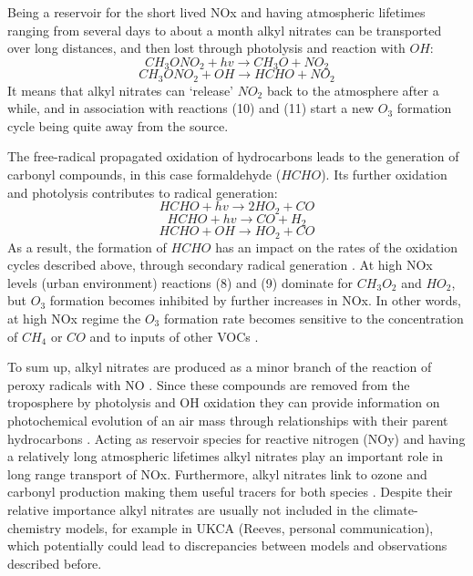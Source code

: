 \documentclass[11pt,a4paper]{article}
\begin{document}
Being a reservoir for the short lived NOx and having atmospheric lifetimes ranging from several days to about a month \citep{Reeves2007} alkyl nitrates can be transported over long distances, and then lost through photolysis and reaction with $OH$:
\begin{equation} \label{eq:CH3NO3hv}
CH_3ONO_2 + hv \rightarrow CH_3O + NO_2
\end{equation}
\begin{equation} \label{eq:CH3NO3+OH}
CH_3ONO_2 + OH \rightarrow HCHO + NO_2
\end{equation}
It means that alkyl nitrates can ‘release’ $NO_2$ back to the atmosphere after a while, and in association with reactions (10) and (11) start a new $O_3$ formation cycle being quite away from the source.

The free-radical propagated oxidation of hydrocarbons leads to the generation of carbonyl compounds, in this case formaldehyde ($HCHO$). Its further oxidation and photolysis contributes to radical generation:
\begin{equation} \label{eq:HCHOhv1}
HCHO + hv \rightarrow 2HO_2 + CO
\end{equation}
\begin{equation} \label{eq:HCHOhv2}
HCHO + hv \rightarrow CO + H_2
\end{equation}
\begin{equation} \label{eq:HCHO+OH}
HCHO + OH \rightarrow HO_2 + CO
\end{equation}
As a result, the formation of $HCHO$ has an impact on the rates of the oxidation cycles described above, through secondary radical generation \citep{Fowler2008}.
At high NOx levels (urban environment) reactions (8) and (9) dominate for $CH_3O_2$ and $HO_2$, but $O_3$ formation becomes inhibited by further increases in NOx. In other words, at high NOx regime the $O_3$ formation rate becomes sensitive to the concentration of $CH_4$ or $CO$ and to inputs of other VOCs \citep{Fowler2008}.

To sum up, alkyl nitrates are produced as a minor branch of the reaction of peroxy radicals with NO \citep{Day2003}. Since these compounds are removed from the troposphere by photolysis and OH oxidation they can provide information on photochemical evolution of an air mass through relationships with their parent hydrocarbons \citep{Bertman1995}. Acting as reservoir species for reactive nitrogen (NOy) and having a relatively long atmospheric lifetimes alkyl nitrates play an important role in long range transport of NOx. Furthermore, alkyl nitrates link to ozone and carbonyl production making them useful tracers for both species \citep{Worton2010}. Despite their relative importance alkyl nitrates are usually not included in the climate-chemistry models, for example in UKCA (Reeves, personal communication), which potentially could lead to discrepancies between models and observations described before. 
\end{document}
